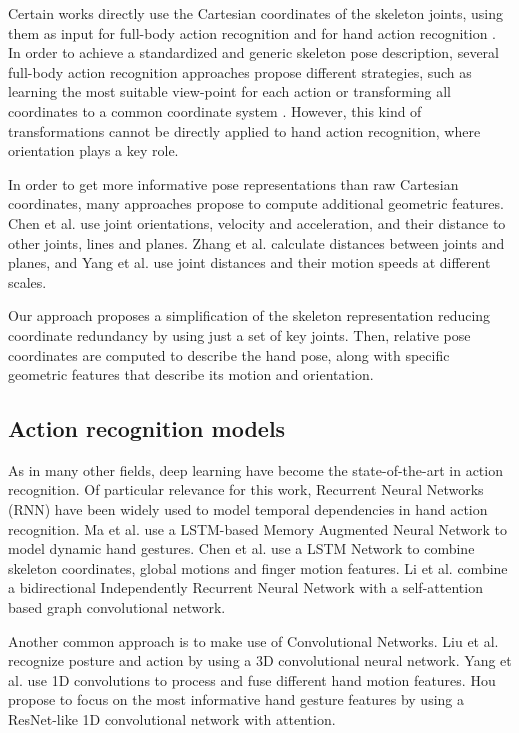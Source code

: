 \documentclass[letterpaper, 10 pt, conference]{ieeeconf}
\begin{document}
Certain works directly use the Cartesian coordinates of the skeleton joints, using them as input for full-body action recognition \cite{perez2019interaction, liu2019ntu} and for  hand action recognition \cite{hou2018spatial, ma2020skeleton, li2021two}. 
In order to achieve a standardized and generic skeleton pose description, several full-body action recognition approaches propose different strategies, such as learning the most suitable view-point for each action \cite{zhang2019view} or transforming all coordinates to a common coordinate system \cite{sabater2021oneshot, su2020predict}. However, this kind of transformations cannot be directly applied to hand action recognition, where orientation plays a key role. 

In order to get more informative pose representations than raw Cartesian coordinates, many approaches propose to compute additional geometric features. Chen et al. \cite{chen2010learning} use joint orientations, velocity and acceleration, and their distance to other joints, lines and planes. Zhang et al. \cite{zhang2017geometric} calculate distances between joints and planes, and Yang et al.  \cite{yang2019make} use joint distances and their motion speeds at different scales.


Our approach proposes a simplification of the skeleton representation reducing coordinate redundancy by using just a set of key joints. 
Then, relative pose coordinates are computed to describe the hand pose, along with specific geometric features that describe its motion and orientation.

\subsection{Action recognition models}

As in many other fields, deep learning have become the state-of-the-art in action recognition. Of particular relevance for this work, Recurrent Neural Networks (RNN) have been widely used to model temporal dependencies in hand action recognition.
Ma et al. \cite{ma2020skeleton} use a LSTM-based Memory Augmented Neural Network to model dynamic hand gestures. Chen et al. \cite{chen2019mfa} use a LSTM Network to combine skeleton coordinates, global motions and finger motion features. Li et al.  \cite{li2021two} combine a bidirectional Independently Recurrent Neural Network with a self-attention based graph convolutional network.

Another common approach is to make use of Convolutional Networks. Liu et al. \cite{liu20203d} recognize posture and action by using a 3D convolutional neural network. Yang et al. \cite{yang2019make} use  1D convolutions to process and fuse different hand motion features. Hou \cite{hou2018spatial} propose  to focus on the most informative hand gesture features by using a  ResNet-like 1D convolutional network with attention.
\end{document}
